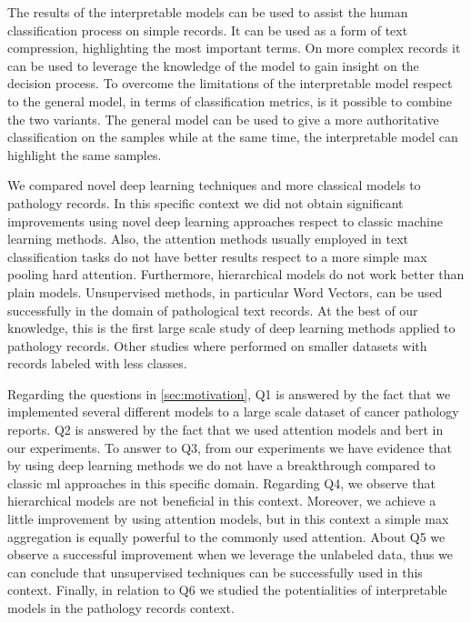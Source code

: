 The results of the interpretable models can be used to
assist the human classification process on simple records. It can be
used as
a form of text compression, highlighting the most important terms. On
more complex records it can be used to leverage the knowledge of the
model to gain insight on the decision process. To overcome the
limitations of the interpretable
model respect to the general model, in terms of
classification metrics, is it possible to combine the two variants. The
general model can be used to give a more
authoritative classification on the samples while at the same time,
the interpretable model can highlight the same samples.

We compared novel deep learning techniques and more classical models
to pathology records. In this specific context we did not obtain
significant improvements using novel deep learning approaches respect
to classic machine learning methods. Also, the attention methods
usually employed in text classification tasks do not have better
results respect to a more simple max pooling hard attention. Furthermore,
hierarchical models do not work better than plain models. Unsupervised
methods, in particular Word Vectors,
can be used successfully in the
domain of pathological text records. At the best of our knowledge, this
is the first large scale study of deep learning methods applied to
pathology records. Other studies where performed on smaller datasets
with records labeled with less classes.

Regarding the questions in \cref{sec:motivation}, Q1 is answered by
the fact that we implemented several different models to a large scale
dataset of cancer pathology reports. Q2 is answered by the fact that
we used attention models and \ac{bert} in our experiments. To answer
to Q3, from our experiments we have evidence that by using deep learning
methods we do not have a breakthrough compared to classic
\ac{ml} approaches in this specific domain. Regarding Q4, we observe
that hierarchical models are not beneficial in this context. Moreover,
we achieve a little improvement by using attention models, but in
this context a simple max aggregation is equally powerful to the
commonly used attention. About Q5 we observe a successful improvement
when we leverage the unlabeled data, thus we can conclude that
unsupervised techniques can be successfully used in this
context. Finally, in relation to Q6 we studied the potentialities of
interpretable models in the pathology records context.

